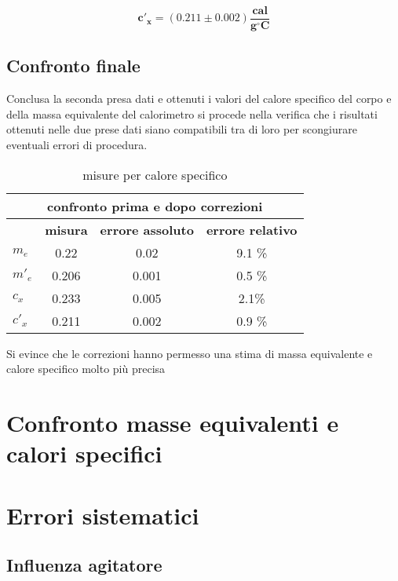 \documentclass{article}
\begin{document}
	\[ 
	\boxed{\boldsymbol{c'_{x} = (0.211 \pm 0.002) \frac{\text{cal}}{g ^\circ C}}}
	\]
	
	\subsection{Confronto finale}
	Conclusa la seconda presa dati e ottenuti i valori del calore specifico del corpo e della massa equivalente del calorimetro si procede nella verifica che i risultati ottenuti nelle due prese dati siano compatibili tra di loro per scongiurare eventuali errori di procedura.
	
	\begin{table}[H] \centering
		\begin{small}
			\begin{tabular}{@{}lccc@{}}\toprule
				\multicolumn{4}{c}{confronto prima e dopo correzioni} \\ \bottomrule
				&  	\textbf{misura}	& \textbf{errore assoluto} & \textbf{errore relativo}   \\ \bottomrule
				\(m_{e}\) & 0.22   & 0.02 & 9.1 \% \\ \hdashline
				\(m'_{e}\) &0.206 & 0.001 & 0.5 \% \\ \midrule
				\(c_{x}\) & 0.233 & 0.005& 2.1\%\\ \hdashline
				\(c'_{x}\) &0.211 & 0.002& 0.9 \%\\ \bottomrule
			\end{tabular}
			\caption{misure per calore specifico}
		\end{small}
	\end{table}
	
Si evince che le correzioni hanno permesso una stima di massa equivalente e calore specifico molto più precisa
	
	
	
	
	
	\newpage
	\section{Confronto masse equivalenti e calori specifici}
	
	\newpage
	\section{Errori sistematici}
	\subsection{Influenza agitatore}
\end{document}
